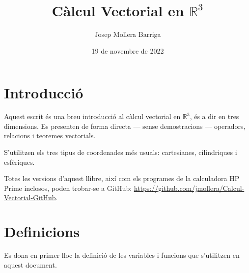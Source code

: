 \documentclass[catalan,a4paper,twoside,11pt]{article}
\begin{document}
\title{Càlcul Vectorial en $\mathbb{R}^3$}
\author{Josep Mollera Barriga}
\date{19 de novembre de 2022}
\maketitle


\section{Introducció}

Aquest escrit és una breu introducció al càlcul vectorial en $\mathbb{R}^3$, és a dir en tres dimensions. Es presenten de forma directa --- sense demostracions --- operadors, relacions i teoremes vectorials.

S'utilitzen els tres tipus de coordenades més usuals:  cartesianes, 
cilíndriques i esfèriques.

Totes les versions d'aquest llibre, així com els programes de la calculadora \textsf{HP Prime} inclosos, poden trobar-se a GitHub: \href{https://github.com/jmollera/Calcul-Vectorial-GitHub}{https://github.com/jmollera/Calcul-Vectorial-GitHub}.


\section{Definicions}

Es dona  en primer lloc la definició de les variables i funcions que s'utilitzen en aquest document.
\end{document}
